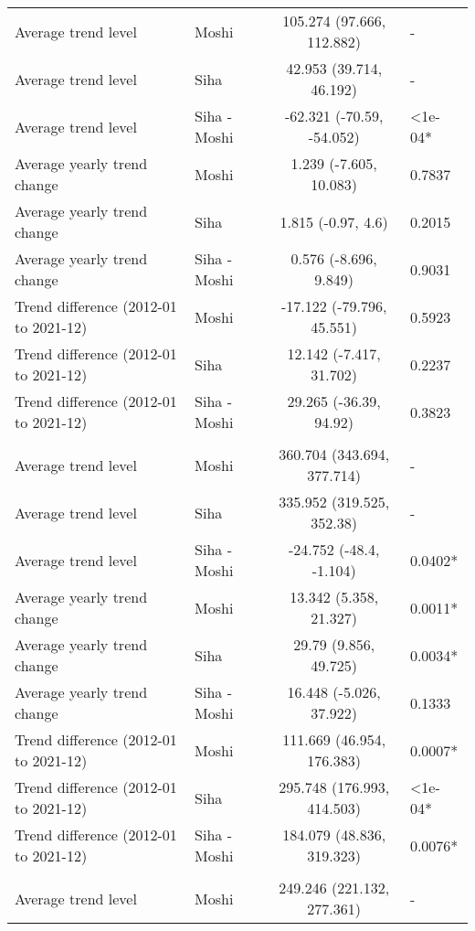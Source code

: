 \begin{longtable}{l|lcl}
\midrule\addlinespace[2.5pt]
\multicolumn{4}{l}{Other Cardiovascular Diseases} \\[2.5pt] 
\midrule\addlinespace[2.5pt]
Average trend level & Moshi & 105.274 (97.666, 112.882) & - \\ 
Average trend level & Siha & 42.953 (39.714, 46.192) & - \\ 
Average trend level & Siha - Moshi & -62.321 (-70.59, -54.052) & <1e-04* \\ 
Average yearly trend change & Moshi & 1.239 (-7.605, 10.083) & 0.7837 \\ 
Average yearly trend change & Siha & 1.815 (-0.97, 4.6) & 0.2015 \\ 
Average yearly trend change & Siha - Moshi & 0.576 (-8.696, 9.849) & 0.9031 \\ 
Trend difference (2012-01 to 2021-12) & Moshi & -17.122 (-79.796, 45.551) & 0.5923 \\ 
Trend difference (2012-01 to 2021-12) & Siha & 12.142 (-7.417, 31.702) & 0.2237 \\ 
Trend difference (2012-01 to 2021-12) & Siha - Moshi & 29.265 (-36.39, 94.92) & 0.3823 \\ 
\midrule\addlinespace[2.5pt]
\multicolumn{4}{l}{Peptic Ulcers} \\[2.5pt] 
\midrule\addlinespace[2.5pt]
Average trend level & Moshi & 360.704 (343.694, 377.714) & - \\ 
Average trend level & Siha & 335.952 (319.525, 352.38) & - \\ 
Average trend level & Siha - Moshi & -24.752 (-48.4, -1.104) & 0.0402* \\ 
Average yearly trend change & Moshi & 13.342 (5.358, 21.327) & 0.0011* \\ 
Average yearly trend change & Siha & 29.79 (9.856, 49.725) & 0.0034* \\ 
Average yearly trend change & Siha - Moshi & 16.448 (-5.026, 37.922) & 0.1333 \\ 
Trend difference (2012-01 to 2021-12) & Moshi & 111.669 (46.954, 176.383) & 0.0007* \\ 
Trend difference (2012-01 to 2021-12) & Siha & 295.748 (176.993, 414.503) & <1e-04* \\ 
Trend difference (2012-01 to 2021-12) & Siha - Moshi & 184.079 (48.836, 319.323) & 0.0076* \\ 
\midrule\addlinespace[2.5pt]
\multicolumn{4}{l}{Pneumonia, Severe} \\[2.5pt] 
\midrule\addlinespace[2.5pt]
Average trend level & Moshi & 249.246 (221.132, 277.361) & - \\ 

\end{longtable}
